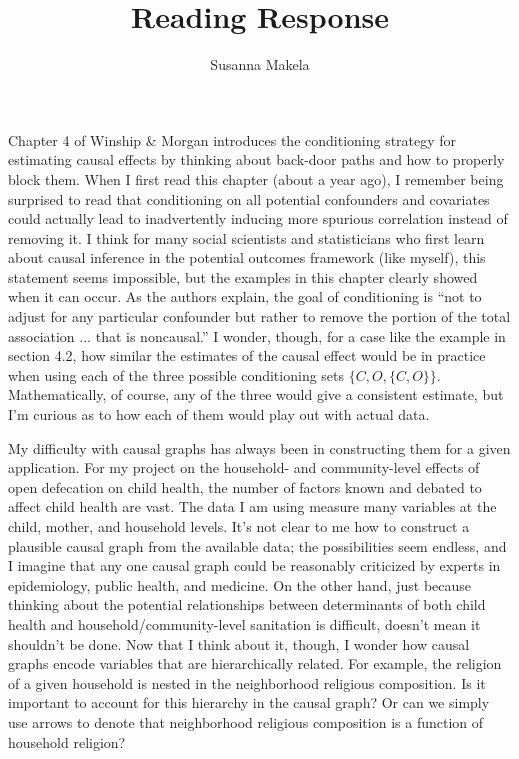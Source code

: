 \documentclass[10pt,a4paper]{article}
\author{Susanna Makela}
\title{Reading Response}
\begin{document}
\maketitle
Chapter 4 of Winship \& Morgan introduces the conditioning strategy for estimating causal effects by thinking about back-door paths and how to properly block them. When I first read this chapter (about a year ago), I remember being surprised to read that conditioning on all potential confounders and covariates could actually lead to inadvertently inducing more spurious correlation instead of removing it. I think for many social scientists and statisticians who first learn about causal inference in the potential outcomes framework (like myself), this statement seems impossible, but the examples in this chapter clearly showed when it can occur. As the authors explain, the goal of conditioning is ``not to adjust for any particular confounder but rather to remove the portion of the total association $\ldots$ that is noncausal.'' I wonder, though, for a case like the example in section 4.2, how similar the estimates of the causal effect would be in practice when using each of the three possible conditioning sets $\{C, O, \{C, O\} \}$. Mathematically, of course, any of the three would give a consistent estimate, but I'm curious as to how each of them would play out with actual data.

My difficulty with causal graphs has always been in constructing them for a given application. For my project on the household- and community-level effects of open defecation on child health, the number of factors known and debated to affect child health are vast. The data I am using measure many variables at the child, mother, and household levels. It's not clear to me how to construct a plausible causal graph from the available data; the possibilities seem endless, and I imagine that any one causal graph could be reasonably criticized by experts in epidemiology, public health, and medicine. On the other hand, just because thinking about the potential relationships between determinants of both child health and household/community-level sanitation is difficult, doesn't mean it shouldn't be done. Now that I think about it, though, I wonder how causal graphs encode variables that are hierarchically related. For example, the religion of a given household is nested in the neighborhood religious composition. Is it important to account for this hierarchy in the causal graph? Or can we simply use arrows to denote that neighborhood religious composition is a function of household religion?
\end{document}

